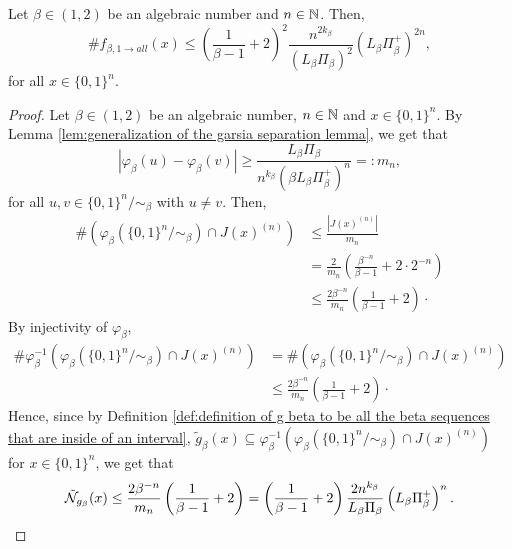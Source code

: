 \begin{lemma}\label{lem:size of the multifunction that generates all beta expansions from one}
    Let $\beta \in (1,2)$ be an algebraic number and $n \in \mathbb{N}$. Then,
    \begin{equation}
        \#f_{\beta, 1 \to all}(x) \leq \left(\frac{1}{\beta-1} + 2\right)^2\frac{n^{2k_\beta}}{(L_\beta\Pi_\beta)^2}\left(L_\beta \Pi_\beta^+ \right)^{2n},
    \end{equation}
    for all $x \in \{0,1\}^n$.
\end{lemma}
\begin{proof}
    Let $\beta \in (1,2)$ be an algebraic number, $n \in \mathbb{N}$ and $x \in \{0,1\}^n$. By Lemma \ref{lem:generalization of the garsia separation lemma}, we get that 
    \begin{equation}
        |\varphi_\beta(u) - \varphi_\beta(v)| \geq \frac{L_\beta\Pi_\beta}{n^{k_\beta}\left(\beta L_\beta  \Pi_\beta^+ \right)^n} =: m_n,
    \end{equation}
    for all $u,v \in \{0,1\}^n / \sim_\beta$ with $u \neq v$. Then,
    \begin{align}
        \# \left(\varphi_\beta(\{0,1\}^n / \sim_\beta) \cap J(x)^{(n)}\right) &\leq \frac{|J(x)^{(n)}|}{m_n}\\
        & = \frac{2}{m_n}\left(\frac{\beta^{-n}}{\beta-1} + 2 \cdot 2^{-n}\right)\\
        & \leq \frac{2\beta^{-n}}{m_n}\left(\frac{1}{\beta-1} + 2\right) \cdot
    \end{align}
    By injectivity of $\varphi_\beta$,
    \begin{align}
        \# \varphi_\beta^{-1} \left(\varphi_\beta(\{0,1\}^n / \sim_\beta) \cap J(x)^{(n)}\right) &= \# \left(\varphi_\beta(\{0,1\}^n / \sim_\beta) \cap J(x)^{(n)}\right)\\ 
        &\leq \frac{2\beta^{-n}}{m_n}\left(\frac{1}{\beta-1} + 2\right) \cdot
    \end{align}
    Hence, since by Definition \ref{def:definition of g beta to be all the beta sequences that are inside of an interval}, $\tilde g_\beta(x) \subseteq \varphi_\beta^{-1} \left(\varphi_\beta(\{0,1\}^n / \sim_\beta) \cap J(x)^{(n)}\right)$ for $x \in \{0,1\}^n$, we get that 
    \begin{equation}
        \tilde {\mathcal{N}}_{g_\beta}(x) \leq  \frac{2\beta^{-n}}{m_n}\left(\frac{1}{\beta-1} + 2\right) = \left(\frac{1}{\beta-1} + 2\right)\frac{2n^{k_\beta}}{L_\beta \Pi_\beta} \left(L_\beta \Pi_\beta^+ \right)^{n}.
    \end{equation}
    

\end{proof}
